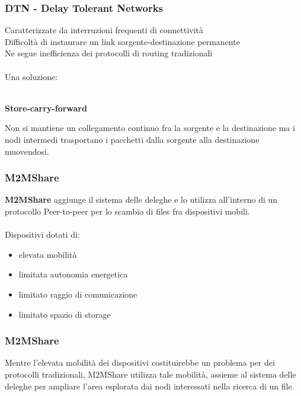 \documentclass{beamer}
\begin{document}
\begin{frame}
\frametitle{DTN - Delay Tolerant Networks}

Caratterizzate da interruzioni frequenti di connettività\\
Difficoltà di instaurare un link sorgente-destinazione permanente\\
Ne segue inefficienza dei protocolli di routing tradizionali\\
\ \\
\pause 
Una soluzione:\\
\ \\
\begin{center}
\textbf{Store-carry-forward}\\
\end{center}

Non si mantiene un collegamento continuo fra la sorgente e la destinazione ma i nodi intermedi trasportano i pacchetti dalla sorgente alla destinazione muovendosi.
\end{frame}




\begin{frame}
\frametitle{M2MShare}
\textbf{M2MShare} aggiunge il sistema delle deleghe e lo utilizza all'interno di un protocollo Peer-to-peer per lo scambio di files fra dispositivi mobili.
\ \\
\ \\
\pause 
Dispositivi dotati di:
\begin{itemize}
\item elevata mobilità
\item limitata autonomia energetica
\item limitato raggio di comunicazione
\item limitato spazio di storage
\end{itemize}
\end{frame}

\begin{frame}
\frametitle{M2MShare}
Mentre l'elevata mobilità dei dispositivi costituirebbe un problema per dei protocolli tradizionali, M2MShare utilizza tale mobilità, assieme al sistema delle deleghe per ampliare l'area esplorata dai nodi interessati nella ricerca di un file.
\end{frame}
\end{document}
